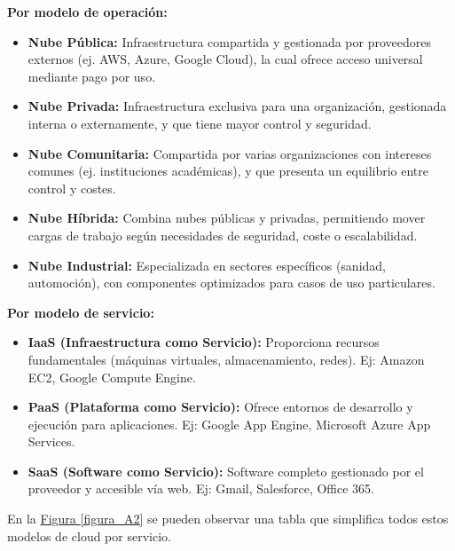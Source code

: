 \begin{enumerate}
	\textbf{Por modelo de operación:}
		\begin{itemize}
			\item \textbf{Nube Pública:} Infraestructura compartida y gestionada por proveedores externos (ej. AWS, Azure, Google Cloud), la cual ofrece acceso universal mediante pago por uso.
			\item \textbf{Nube Privada:} Infraestructura exclusiva para una organización, gestionada interna o externamente, y que tiene mayor control y seguridad.
			\item \textbf{Nube Comunitaria:} Compartida por varias organizaciones con intereses comunes (ej. instituciones académicas), y que presenta un equilibrio entre control y costes.
			\item \textbf{Nube Híbrida:} Combina nubes públicas y privadas, permitiendo mover cargas de trabajo según necesidades de seguridad, coste o escalabilidad.
			\item \textbf{Nube Industrial:} Especializada en sectores específicos (sanidad, automoción), con componentes optimizados para casos de uso particulares.
		\end{itemize}
		
		\textbf{Por modelo de servicio:}
		\begin{itemize}
			\item \textbf{IaaS (Infraestructura como Servicio):} Proporciona recursos fundamentales (máquinas virtuales, almacenamiento, redes). Ej: Amazon EC2, Google Compute Engine.
			\item \textbf{PaaS (Plataforma como Servicio):} Ofrece entornos de desarrollo y ejecución para aplicaciones. Ej: Google App Engine, Microsoft Azure App Services.
			\item \textbf{SaaS (Software como Servicio):} Software completo gestionado por el proveedor y accesible vía web. Ej: Gmail, Salesforce, Office 365.
		\end{itemize}
		
		En la \hyperref[figura_A2]{Figura \ref*{figura_A2}} se pueden observar una tabla que simplifica todos estos modelos de cloud por servicio.
		

\end{enumerate}
